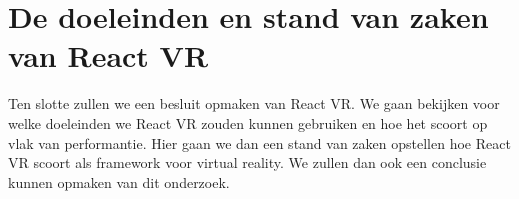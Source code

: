 \section{De doeleinden en stand van zaken van React VR}
Ten slotte zullen we een besluit opmaken van React VR. We gaan bekijken voor welke doeleinden we React VR zouden kunnen gebruiken en hoe het scoort op vlak van performantie. Hier gaan we dan een stand van zaken opstellen hoe React VR scoort als framework voor virtual reality. We zullen dan ook een conclusie kunnen opmaken van dit onderzoek.



